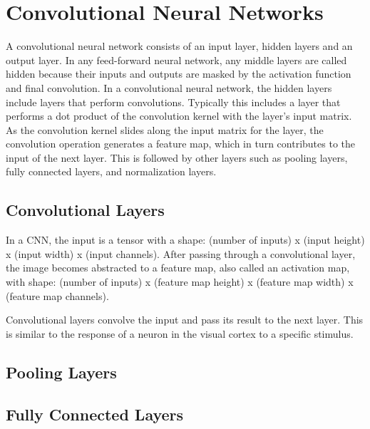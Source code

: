 \documentclass[conference]{IEEEtran}
\begin{document}
\section{Convolutional Neural Networks}
A convolutional neural network consists of an input layer, hidden layers and an output layer. In any feed-forward neural network, any middle layers are called hidden because their inputs and outputs are masked by the activation function and final convolution. In a convolutional neural network, the hidden layers include layers that perform convolutions. Typically this includes a layer that performs a dot product of the convolution kernel with the layer's input matrix. As the convolution kernel slides along the input matrix for the layer, the convolution operation generates a feature map, which in turn contributes to the input of the next layer. This is followed by other layers such as pooling layers, fully connected layers, and normalization layers.
\subsection{Convolutional Layers}
In a CNN, the input is a tensor with a shape: (number of inputs) x (input height) x (input width) x (input channels). After passing through a convolutional layer, the image becomes abstracted to a feature map, also called an activation map, with shape: (number of inputs) x (feature map height) x (feature map width) x (feature map channels).
\par Convolutional layers convolve the input and pass its result to the next layer. This is similar to the response of a neuron in the visual cortex to a specific stimulus.

\subsection{Pooling Layers}
\blindtext

\subsection{Fully Connected Layers}
\blindtext
\end{document}
